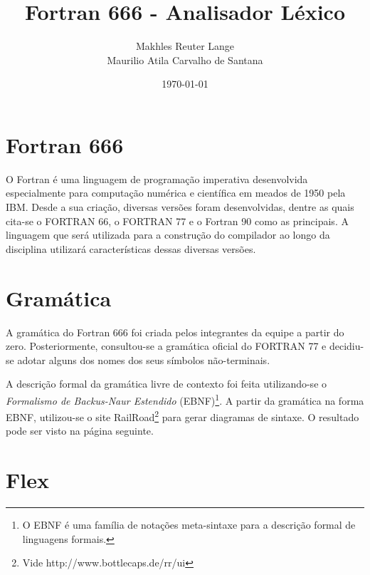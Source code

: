 \documentclass[a4paper,12pt]{article}
\begin{document}
\title{Fortran 666 - Analisador Léxico}
\author{Makhles Reuter Lange \\ Maurilio Atila Carvalho de Santana}
\date{\today}
\maketitle


\section{Fortran 666}

O Fortran é uma linguagem de programação imperativa desenvolvida especialmente para computação numérica e científica em meados de 1950 pela IBM. Desde a sua criação, diversas versões foram desenvolvidas, dentre as quais cita-se o FORTRAN 66, o FORTRAN 77 e o Fortran 90 como as principais. A linguagem que será utilizada para a construção do compilador ao longo da disciplina utilizará características dessas diversas versões.


\section{Gramática}

A gramática do Fortran 666 foi criada pelos integrantes da equipe a partir do zero. Posteriormente, consultou-se a gramática oficial do FORTRAN 77 e decidiu-se adotar alguns dos nomes dos seus símbolos não-terminais.

A descrição formal da gramática livre de contexto foi feita utilizando-se o \emph{Formalismo de Backus-Naur Estendido} (EBNF)\footnote{O EBNF é uma família de notações meta-sintaxe para a descrição formal de linguagens formais.}. A partir da gramática na forma EBNF, utilizou-se o site RailRoad\footnote{Vide http://www.bottlecaps.de/rr/ui} para gerar diagramas de sintaxe. O resultado pode ser visto na página seguinte.




\section{Flex}
\end{document}
